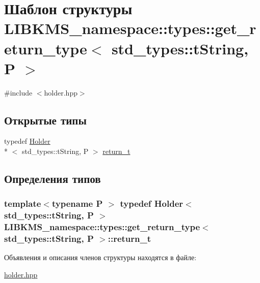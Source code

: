 \hypertarget{structLIBKMS__namespace_1_1types_1_1get__return__type_3_01std__types_1_1tString_00_01P_01_4}{\section{Шаблон структуры L\-I\-B\-K\-M\-S\-\_\-namespace\-:\-:types\-:\-:get\-\_\-return\-\_\-type$<$ std\-\_\-types\-:\-:t\-String, P $>$}
\label{structLIBKMS__namespace_1_1types_1_1get__return__type_3_01std__types_1_1tString_00_01P_01_4}
}


{\ttfamily \#include $<$holder.\-hpp$>$}

\subsection*{Открытые типы}
\begin{DoxyCompactItemize}
\item 
typedef \hyperlink{classLIBKMS__namespace_1_1Holder}{Holder}\\*
$<$ std\-\_\-types\-::t\-String, P $>$ \hyperlink{structLIBKMS__namespace_1_1types_1_1get__return__type_3_01std__types_1_1tString_00_01P_01_4_a28453f62981bb992e90f36ba5b62e943}{return\-\_\-t}
\end{DoxyCompactItemize}


\subsection{Определения типов}
\hypertarget{structLIBKMS__namespace_1_1types_1_1get__return__type_3_01std__types_1_1tString_00_01P_01_4_a28453f62981bb992e90f36ba5b62e943}{
\subsubsection[{return\-\_\-t}]{\setlength{\rightskip}{0pt plus 5cm}template$<$typename P $>$ typedef {\bf Holder}$<$ std\-\_\-types\-::t\-String, P $>$ {\bf L\-I\-B\-K\-M\-S\-\_\-namespace\-::types\-::get\-\_\-return\-\_\-type}$<$ std\-\_\-types\-::t\-String, P $>$\-::{\bf return\-\_\-t}}}\label{structLIBKMS__namespace_1_1types_1_1get__return__type_3_01std__types_1_1tString_00_01P_01_4_a28453f62981bb992e90f36ba5b62e943}


Объявления и описания членов структуры находятся в файле\-:\begin{DoxyCompactItemize}
\item 
\hyperlink{holder_8hpp}{holder.\-hpp}\end{DoxyCompactItemize}
